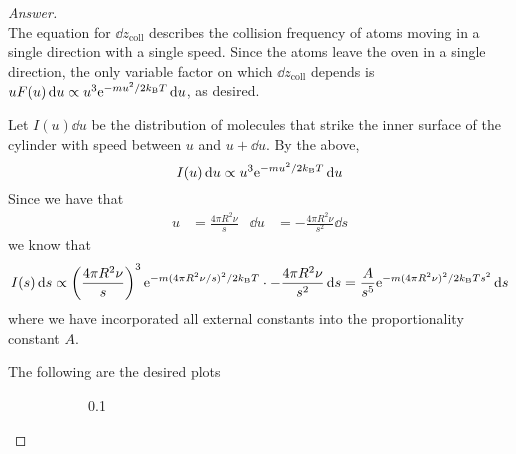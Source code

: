 \documentclass[../psets.tex]{subfiles}
\begin{document}
\begin{enumerate}[label={\textbf{27-\arabic*.}},leftmargin=3.5em]
\begin{proof}[Answer]
\begin{equation*}
        \end{equation*}
        The equation for $\dd{z_\text{coll}}$ describes the collision frequency of atoms moving in a single direction with a single speed. Since the atoms leave the oven in a single direction, the only variable factor on which $\dd{z_\text{coll}}$ depends is $uF(u)\dd{u}\propto u^3\e[-mu^2/2\kB T]\dd{u}$, as desired.\par
        Let $I(u)\dd{u}$ be the distribution of molecules that strike the inner surface of the cylinder with speed between $u$ and $u+\dd{u}$. By the above,
        \begin{equation*}
            I(u)\dd{u} \propto u^3\e[-mu^2/2\kB T]\dd{u}
        \end{equation*}
        Since we have that
        \begin{align*}
            u &= \frac{4\pi R^2\nu}{s}&
            \dd{u} &= -\frac{4\pi R^2\nu}{s^2}\dd{s}
        \end{align*}
        we know that
        \begin{equation*}
            I(s)\dd{s} \propto \left( \frac{4\pi R^2\nu}{s} \right)^3\e[-m(4\pi R^2\nu/s)^2/2\kB T]\cdot -\frac{4\pi R^2\nu}{s^2}\dd{s}
            = \frac{A}{s^5}\e[-m(4\pi R^2\nu)^2/2\kB Ts^2]\dd{s}
        \end{equation*}
        where we have incorporated all external constants into the proportionality constant $A$.\par
        The following are the desired plots
        \begin{figure}[H]
            \centering
            \begin{subfigure}[b]{0.3\linewidth}
                \centering
                \caption{0.1}
            \end{subfigure}
            \begin{subfigure}[b]{0.3\linewidth}
                \centering
\end{subfigure}
\end{figure}
\end{proof}
\end{enumerate}
\end{document}
